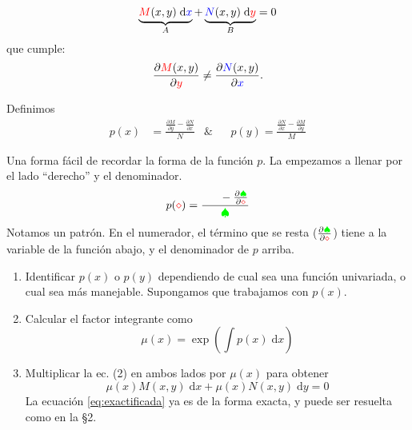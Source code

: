 \documentclass[a4paper]{article}
\newcommand{\dif}[1]{\;\mathrm{d}#1}
\begin{document}
\begin{equation}
    \label{eq:forma-exacta-2}
    \underbrace{{\color{red}M}(x,y) \dif{{\color{blue}x}}}_{A} + \underbrace{{\color{blue}N}(x,y) \dif{{\color{red} y}}}_{B} = 0  
\end{equation}
que cumple:
\begin{equation*}
    \frac{\partial {\color{red}M}(x,y)}{\partial {\color{red}y }} \neq \frac{\partial {\color{blue} N}(x,y)}{\partial {\color{blue} x}}.
\end{equation*}

Definimos
\begin{align*}
    p(x) &= \frac{\frac{\partial M}{\partial y} - \frac{\partial N}{\partial x}}{N} &\text{\&} && p(y) = \frac{\frac{\partial N}{\partial x} - \frac{\partial M}{\partial y}}{M}
\end{align*}

\begin{obs}
    Una forma fácil de recordar la forma de la función $p$.
    La empezamos a llenar por el lado ``derecho'' y el denominador.
    \begin{equation*}
        p({\color{red} \diamond}) = \frac{\phantom{\frac{\partial M}{\partial x}} - \frac{\partial {\color{green} \spadesuit}}{\partial{\color{red} \diamond}}}{{\color{green} \spadesuit}}
    \end{equation*}
    Notamos un patrón. En el numerador, el término que se resta ($\frac{\partial {\color{green} \spadesuit}}{\partial {\color{red} \diamond} }$) tiene a la variable de la función abajo, y el denominador de $p$ arriba.
\end{obs}

\begin{enumerate}
    \item Identificar $p(x)$ o $p(y)$ dependiendo de cual sea una función univariada, o cual sea más manejable.
    Supongamos que trabajamos con $p(x)$.

    \item Calcular el factor integrante como
    \begin{equation*}
        \mu(x) = \exp \left( \int p(x) \dif{x} \right)
    \end{equation*}

    \item Multiplicar la ec. (2) en ambos lados por $\mu(x)$ para obtener 
    \begin{equation}
        \label{eq:exactificada}
        \mu(x) M(x,y) \dif{x} + \mu(x) N(x,y) \dif{y} = 0
    \end{equation}
    La ecuación \ref{eq:exactificada} ya es de la forma exacta, y puede ser resuelta como en la \S 2.
\end{enumerate}
\end{document}
